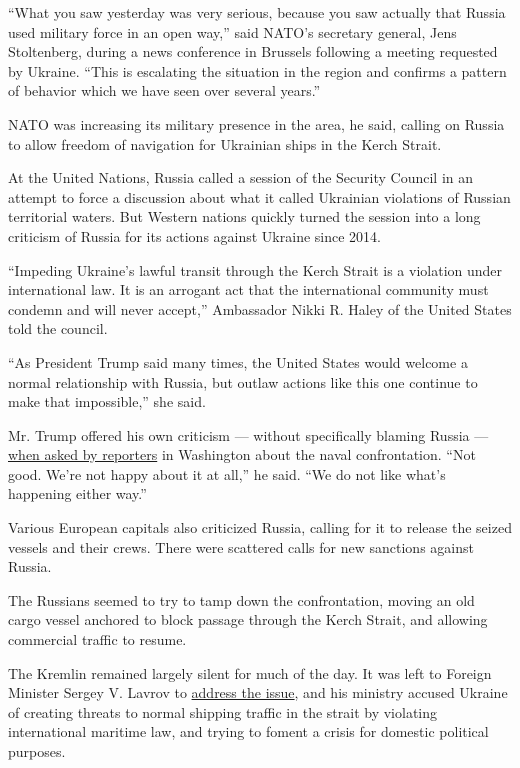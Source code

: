 ``What you saw yesterday was very serious, because you saw actually that
Russia used military force in an open way,'' said NATO's secretary
general, Jens Stoltenberg, during a news conference in Brussels
following a meeting requested by Ukraine. ``This is escalating the
situation in the region and confirms a pattern of behavior which we have
seen over several years.''

NATO was increasing its military presence in the area, he said, calling
on Russia to allow freedom of navigation for Ukrainian ships in the
Kerch Strait.

At the United Nations, Russia called a session of the Security Council
in an attempt to force a discussion about what it called Ukrainian
violations of Russian territorial waters. But Western nations quickly
turned the session into a long criticism of Russia for its actions
against Ukraine since 2014.

``Impeding Ukraine's lawful transit through the Kerch Strait is a
violation under international law. It is an arrogant act that the
international community must condemn and will never accept,'' Ambassador
Nikki R. Haley of the United States told the council.

``As President Trump said many times, the United States would welcome a
normal relationship with Russia, but outlaw actions like this one
continue to make that impossible,'' she said.

Mr. Trump offered his own criticism --- without specifically blaming
Russia ---
\href{https://www.reuters.com/video/2018/11/26/trump-does-not-like-russia-ukraine-situa?videoId=485722993\&videoChannel=117760\&channelName=World+News}{when
asked by reporters} in Washington about the naval confrontation. ``Not
good. We're not happy about it at all,'' he said. ``We do not like
what's happening either way.''

Various European capitals also criticized Russia, calling for it to
release the seized vessels and their crews. There were scattered calls
for new sanctions against Russia.

The Russians seemed to try to tamp down the confrontation, moving an old
cargo vessel anchored to block passage through the Kerch Strait, and
allowing commercial traffic to resume.

The Kremlin remained largely silent for much of the day. It was left to
Foreign Minister Sergey V. Lavrov to
\href{http://www.mid.ru/ru/foreign_policy/news/-/asset_publisher/cKNonkJE02Bw/content/id/3420678?p_p_id=101_INSTANCE_cKNonkJE02Bw\&_101_INSTANCE_cKNonkJE02Bw_languageId=en_GB}{address
the issue}, and his ministry accused Ukraine of creating threats to
normal shipping traffic in the strait by violating international
maritime law, and trying to foment a crisis for domestic political
purposes.

